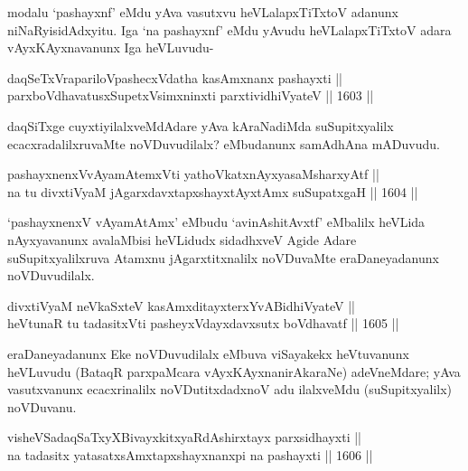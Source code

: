 \begin{artha}
modalu `pashayxnf' eMdu yAva vasutxvu heVLalapxTiTxtoV adanunx niNaRyisidAdxyitu. Iga `na pashayxnf' eMdu yAvudu heVLalapxTiTxtoV adara vAyxKAyxnavanunx Iga heVLuvudu-
\end{artha}

\begin{shl}
daqSeTxVrapariloVpashecxVdatha kasAmxnanx pashayxti || \\
parxboVdhavatusxSupetxV\s simxninxti parxtividhiVyateV \hfill || 1603 || 
\end{shl}

\begin{artha}
daqSiTxge cuyxtiyilalxveMdAdare yAva kAraNadiMda suSupitxyalilx ecacxradalilxruvaMte noVDuvudilalx? eMbudanunx samAdhAna mADuvudu.
\end{artha}

\begin{shl}
pashayxnenxVvAyamAtemxVti yathoVkatxnAyxyasaMsharxyAtf ||  \\
na tu divxtiVyaM jAgarxdavxtapxshayxtAyxtAmx suSupatxgaH \hfill || 1604 ||  
\end{shl}

\begin{artha}
`pashayxnenxV vAyamAtAmx' eMbudu `avinAshitAvxtf' eMbalilx heVLida nAyxyavanunx avalaMbisi heVLidudx sidadhxveV Agide Adare suSupitxyalilxruva Atamxnu jAgarxtitxnalilx noVDuvaMte eraDaneyadanunx noVDuvudilalx.
\end{artha}

\begin{shl}
divxtiVyaM neVkaSxteV kasAmxditayxterxYvABidhiVyateV || \\
heVtunaR tu tadasitxVti pasheyxVdayxdavxsutx boVdhavatf \hfill || 1605 ||  
\end{shl}

\begin{artha}
eraDaneyadanunx Eke noVDuvudilalx eMbuva viSayakekx heVtuvanunx heVLuvudu (BataqR parxpaMcara vAyxKAyxnanirAkaraNe) adeVneMdare; yAva vasutxvanunx ecacxrinalilx noVDutitxdadxnoV adu ilalxveMdu (suSupitxyalilx) noVDuvanu.
\end{artha}


\begin{shl}
visheVSadaqSaTxyXBivayxkitxyaRdAshirxtayx parxsidhayxti ||  \\
na tadasitx yatasatxsAmxtapxshayxnanxpi na pashayxti \hfill || 1606 ||
\end{shl}

